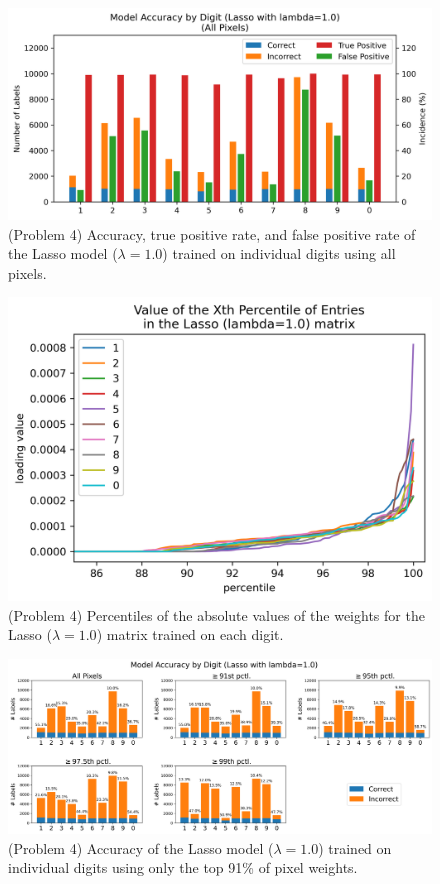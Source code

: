 \documentclass[10pt]{article}
\begin{document}
\begin{figure}[ht]
\centerline{\includegraphics[scale=0.85]{figures/DIGIT_ALL_PIXELS_lasso_accuracy_comparison.png}}
\caption{(Problem 4) Accuracy, true positive rate, and false positive rate of the Lasso model ($\lambda=1.0$) trained on individual digits using all pixels.}
\label{fig21}
\end{figure}

\begin{figure}[ht]
\centerline{\includegraphics[scale=0.9]{figures/DIGIT_lasso_loading_percentiles-see_uptick_at_91.png}}
\caption{(Problem 4) Percentiles of the absolute values of the weights for the Lasso ($\lambda=1.0$) matrix trained on each digit.}
\label{fig22}
\end{figure}

\begin{figure}[ht]
\centerline{\includegraphics[scale=0.5]{figures/DIGIT_PCTS_lasso_accuracy_comparison.png}}
\caption{(Problem 4) Accuracy of the Lasso model ($\lambda=1.0$) trained on individual digits using only the top 91\% of pixel weights.}
\label{fig23}
\end{figure}
\end{document}
